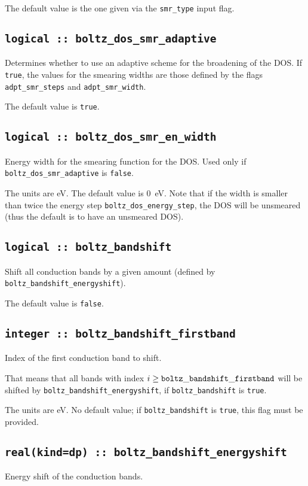 The default value is the one given via the {\tt smr\_type} input flag. 


\subsection[boltz\_dos\_smr\_adaptive]{\tt logical :: boltz\_dos\_smr\_adaptive}
Determines whether to use an adaptive scheme for the broadening of the DOS. If \verb#true#, the values for the smearing widths are those defined by the flags {\tt adpt\_smr\_steps} and {\tt adpt\_smr\_width}.

The default value is \verb#true#.

\subsection[boltz\_dos\_smr\_en\_width]{\tt logical :: boltz\_dos\_smr\_en\_width}
Energy width for the smearing function for the DOS. Used only if {\tt boltz\_dos\_smr\_adaptive} is \verb#false#.

The units are eV.
The default value is 0~eV. Note that if the width is smaller than twice the energy step {\tt boltz\_dos\_energy\_step}, the DOS will be unsmeared (thus the default is to have an unsmeared DOS).


\subsection[boltz\_bandshift]{\tt logical :: boltz\_bandshift}
Shift all conduction bands by a given amount (defined by {\tt boltz\_bandshift\_energyshift}).

The default value is \verb#false#.

\subsection[boltz\_bandshift\_firstband]{\tt integer :: boltz\_bandshift\_firstband}
Index of the first conduction band to shift.

That means that all bands with index $i\ge {\tt boltz\_bandshift\_firstband}$ will be shifted by  {\tt boltz\_bandshift\_energyshift}, if {\tt boltz\_bandshift} is \verb#true#.

The units are eV.
No default value; if {\tt boltz\_bandshift} is \verb#true#, this flag must be provided.

\subsection[boltz\_bandshift\_energyshift]{\tt real(kind=dp) :: boltz\_bandshift\_energyshift}
Energy shift of the conduction bands.

